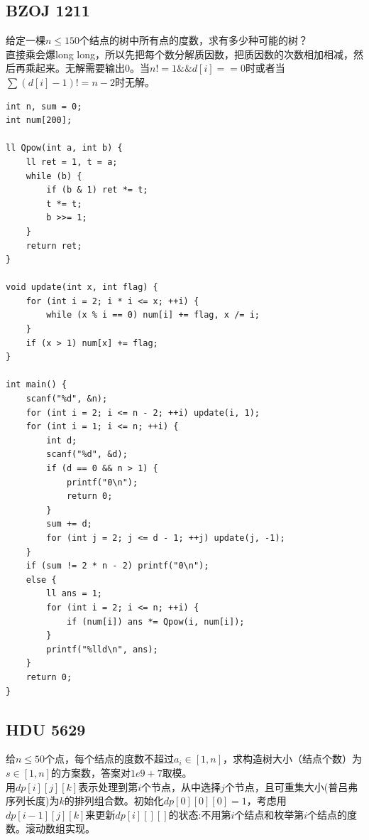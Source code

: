 \subsection{BZOJ 1211}
给定一棵$n\leq 150$个结点的树中所有点的度数，求有多少种可能的树？ \\
直接乘会爆long long，所以先把每个数分解质因数，把质因数的次数相加相减，然后再乘起来。无解需要输出0。当$n!=1\&\&d[i]==0$时或者当$\sum(d[i]-1)!=n-2$时无解。
\begin{lstlisting}
int n, sum = 0;
int num[200];

ll Qpow(int a, int b) {
    ll ret = 1, t = a;
    while (b) {
        if (b & 1) ret *= t;
        t *= t;
        b >>= 1;
    }
    return ret;
}

void update(int x, int flag) {
    for (int i = 2; i * i <= x; ++i) {
        while (x % i == 0) num[i] += flag, x /= i;
    }
    if (x > 1) num[x] += flag;
}

int main() {
    scanf("%d", &n);
    for (int i = 2; i <= n - 2; ++i) update(i, 1);
    for (int i = 1; i <= n; ++i) {
        int d;
        scanf("%d", &d);
        if (d == 0 && n > 1) {
            printf("0\n");
            return 0;
        }
        sum += d;
        for (int j = 2; j <= d - 1; ++j) update(j, -1);
    }
    if (sum != 2 * n - 2) printf("0\n");
    else {
        ll ans = 1;
        for (int i = 2; i <= n; ++i) {
            if (num[i]) ans *= Qpow(i, num[i]);
        }
        printf("%lld\n", ans);
    }
    return 0;
}
\end{lstlisting}
\subsection{HDU 5629}
给$n\leq 50$个点，每个结点的度数不超过$a_i\in [1,n]$，求构造树大小（结点个数）为$s\in [1,n]$的方案数，答案对$1e9+7$取模。\\

用$dp[i][j][k]$表示处理到第$i$个节点，从中选择$j$个节点，且可重集大小(普吕弗序列长度)为$k$的排列组合数。初始化$dp[0][0][0]=1$，考虑用$dp[i-1][j][k]$来更新$dp[i][][]$的状态:不用第$i$个结点和枚举第$i$个结点的度数。滚动数组实现。\\

